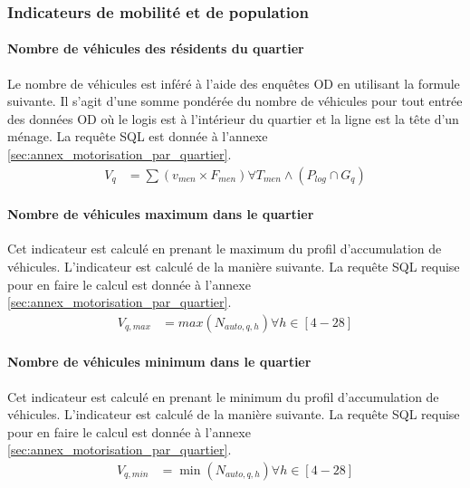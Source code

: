         \subsubsection{Indicateurs de mobilité et de population}
            \paragraph{Nombre de véhicules des résidents du quartier}\label{par:n_vehicules_quartiers} Le nombre de véhicules est inféré à l'aide des enquêtes OD en utilisant la formule suivante. Il s'agit d'une somme pondérée du nombre de véhicules pour tout entrée des données OD où le logis est à l'intérieur du quartier et la ligne est la tête d'un ménage. La requête SQL est donnée à l'annexe \ref{sec:annex_motorisation_par_quartier}.
            \begin{align}
                V_{q} &= \sum{\left(v_{men} \times F_{men}\right)} \forall T_{men}  \wedge \left(P_{log}\cap G_q\right)
            \end{align}
            \paragraph{Nombre de véhicules maximum dans le quartier} Cet indicateur est calculé en prenant le maximum du profil d'accumulation de véhicules. L'indicateur est calculé de la manière suivante. La requête SQL requise pour en faire le calcul est donnée à l'annexe \ref{sec:annex_motorisation_par_quartier}.
            \begin{align}
                V_{q,max} &= max\left(N_{auto,q,h}\right) \forall h \in [4-28]
            \end{align}
            \paragraph{Nombre de véhicules minimum dans le quartier} Cet indicateur est calculé en prenant le minimum du profil d'accumulation de véhicules. L'indicateur est calculé de la manière suivante. La requête SQL requise pour en faire le calcul est donnée à l'annexe \ref{sec:annex_motorisation_par_quartier}.
            \begin{align}
                V_{q,min} &= \min\left(N_{auto,q,h}\right) \forall h \in [4-28]
            \end{align}
